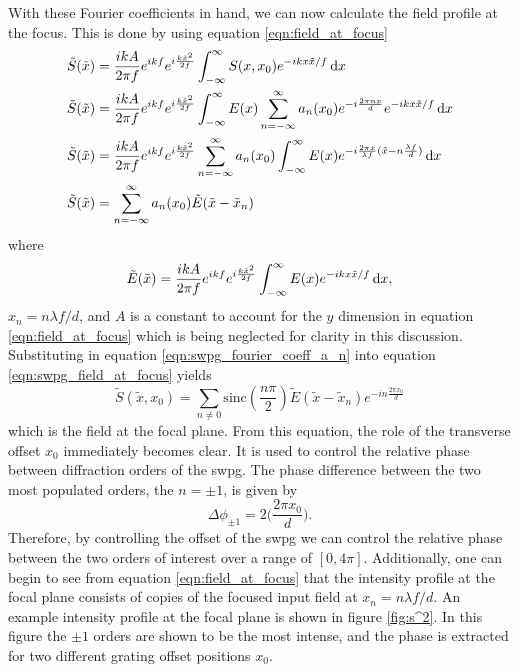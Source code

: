With these Fourier coefficients in hand, we can now calculate the field profile at the focus.  This is done by using equation \ref{eqn:field_at_focus}
\begin{equation}
\label{eqn:swpg_field_at_focus}
	\begin{aligned}
		\tilde{S}(\tilde{x}) &= \frac{i k A}{2\pi f}e^{ikf}e^{i\frac{k\tilde{x}^2}{2f}}\int_{-\infty}^{\infty}S(x,x_0)e^{-ikx\tilde{x}/f}\mathop{}\!\mathrm{d} x\\
		\tilde{S}(\tilde{x}) &= \frac{i k A}{2\pi f}e^{ikf}e^{i\frac{k\tilde{x}^2}{2f}}\int_{-\infty}^{\infty} E(x) \sum_{n=-\infty}^{\infty}a_n(x_0)e^{-i\frac{2\pi nx}{d}} e^{-ikx\tilde{x}/f}\mathop{}\!\mathrm{d} x\\
		\tilde{S}(\tilde{x}) &= \frac{i k A}{2\pi f}e^{ikf}e^{i\frac{k\tilde{x}^2}{2f}}\sum_{n=-\infty}^{\infty}a_n(x_0) \int_{-\infty}^{\infty} E(x) e^{-i\frac{2\pi x}{\lambda f}(\tilde{x} - n\frac{\lambda f}{d})}\mathop{}\!\mathrm{d} x\\
		\tilde{S}(\tilde{x}) &= \sum_{n=-\infty}^{\infty} a_n(x_0) \tilde{E}(\tilde{x} - \tilde{x}_n)
	\end{aligned}
\end{equation}
where
\begin{equation}
	\tilde{E}(\tilde{x}) = \frac{i k A}{2\pi f}e^{ikf}e^{i\frac{k\tilde{x}^2}{2f}} \int_{-\infty}^{\infty}E(x)e^{-ikx\tilde{x}/f}\mathop{}\!\mathrm{d} x,
\end{equation}
$x_n=n\lambda f/d$, and $A$ is a constant to account for the $y$ dimension in equation \ref{eqn:field_at_focus} which is being neglected for clarity in this discussion.  Substituting in equation \ref{eqn:swpg_fourier_coeff_a_n} into equation \ref{eqn:swpg_field_at_focus} yields
\begin{equation}
\label{eqn:swpg_field_at_focus_simple}
	\tilde{S}(\tilde{x}, x_0)=\sum_{n\neq 0}\mathrm{sinc}(\frac{n\pi}{2})\tilde{E}(\tilde{x}-\tilde{x}_n)e^{-in\frac{2\pi x_0}{d}}
\end{equation}
which is the field at the focal plane. From this equation, the role of the transverse offset $x_0$ immediately becomes clear.  It is used to control the relative phase between diffraction orders of the \gls{swpg}.  The phase difference between the two most populated orders, the $n=\pm 1$, is given by
\begin{equation}
\label{eqn:phase_diff}
	\Delta\phi_{\pm 1}=2\bigg(\frac{2\pi x_0}{d}\bigg).
\end{equation}
Therefore, by controlling the offset of the \gls{swpg} we can control the relative phase between the two orders of interest over a range of $[0,4\pi]$.  Additionally, one can begin to see from equation \ref{eqn:field_at_focus} that the intensity profile at the focal plane consists of copies of the focused input field at $x_n = n\lambda f/d$.  An example intensity profile at the focal plane is shown in figure \ref{fig:s^2}. In this figure the $\pm1$ orders are shown to be the most intense, and the phase is extracted for two different grating offset positions $x_0$.   

